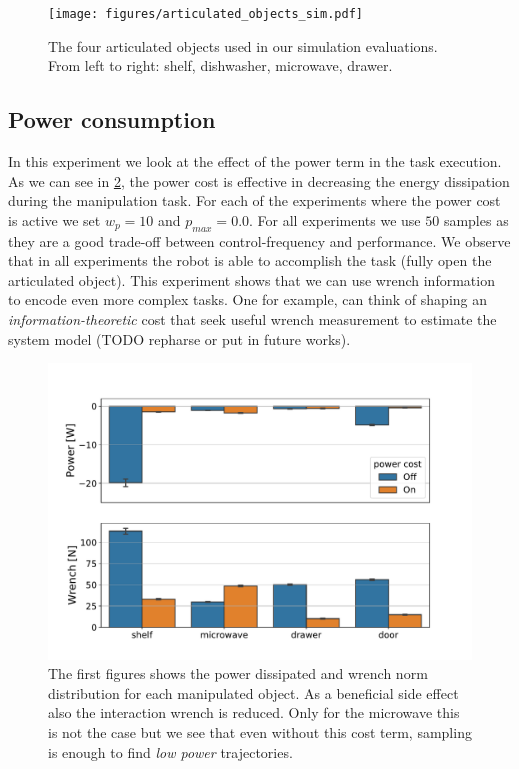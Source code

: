 \begin{figure}[t]
\centering
  \texttt{[image: figures/articulated\_objects\_sim.pdf]}
  \caption{The four articulated objects used in our simulation evaluations. From left to right: shelf, dishwasher, microwave, drawer.} \label{fig:object_manipulation}
\end{figure}

\subsection{Power consumption}
In this experiment we look at the effect of the power term in the task execution. As we can see in \fig \ref{fig:power_cost_comparison}, the power cost is effective in decreasing the energy dissipation during the manipulation task. For each of the experiments where the power cost is active we set $w_p=10$ and $p_{max} = 0.0$. For all experiments we use $50$ samples as they are a good trade-off between control-frequency and performance. We observe that in all experiments the robot is able to accomplish the task (fully open the articulated object). This experiment shows that we can use wrench information to encode even more complex tasks. One for example, can think of shaping an \textit{information-theoretic} cost that seek useful wrench measurement to estimate the system model (TODO repharse or put in future works). 

\begin{figure}[t]
\centering
  \includegraphics[width=\columnwidth]{figures/methods_comparison/power_cost.pdf}
  \caption{The first figures shows the power dissipated and wrench norm distribution for each manipulated object. As a beneficial side effect also the interaction wrench is reduced. Only for the microwave this is not the case but we see that even without this cost term, sampling is enough to find \textit{low power} trajectories.} \label{fig:power_cost_comparison}
\end{figure}


